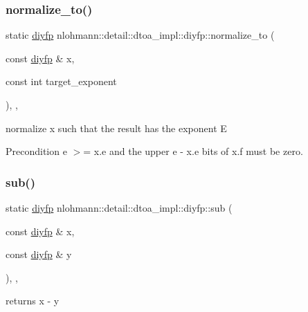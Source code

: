 \subsubsection{\texorpdfstring{normalize\_to()}{normalize\_to()}}
{\footnotesize\ttfamily static \mbox{\hyperlink{structnlohmann_1_1detail_1_1dtoa__impl_1_1diyfp}{diyfp}} nlohmann\+::detail\+::dtoa\+\_\+impl\+::diyfp\+::normalize\+\_\+to (\begin{DoxyParamCaption}\item[{const \mbox{\hyperlink{structnlohmann_1_1detail_1_1dtoa__impl_1_1diyfp}{diyfp}} \&}]{x,  }\item[{const int}]{target\+\_\+exponent }\end{DoxyParamCaption})\hspace{0.3cm}{\ttfamily [inline]}, {\ttfamily [static]}, {\ttfamily [noexcept]}}



normalize x such that the result has the exponent E 

\begin{DoxyPrecond}{Precondition}
e $>$= x.\+e and the upper e -\/ x.\+e bits of x.\+f must be zero. 
\end{DoxyPrecond}
\mbox{\label{structnlohmann_1_1detail_1_1dtoa__impl_1_1diyfp_aeb26771af54ad73598c1a0430d65d884}} 
\subsubsection{\texorpdfstring{sub()}{sub()}}
{\footnotesize\ttfamily static \mbox{\hyperlink{structnlohmann_1_1detail_1_1dtoa__impl_1_1diyfp}{diyfp}} nlohmann\+::detail\+::dtoa\+\_\+impl\+::diyfp\+::sub (\begin{DoxyParamCaption}\item[{const \mbox{\hyperlink{structnlohmann_1_1detail_1_1dtoa__impl_1_1diyfp}{diyfp}} \&}]{x,  }\item[{const \mbox{\hyperlink{structnlohmann_1_1detail_1_1dtoa__impl_1_1diyfp}{diyfp}} \&}]{y }\end{DoxyParamCaption})\hspace{0.3cm}{\ttfamily [inline]}, {\ttfamily [static]}, {\ttfamily [noexcept]}}



returns x -\/ y 

